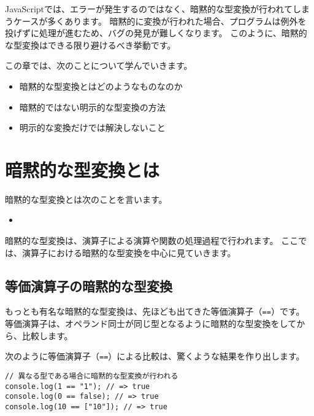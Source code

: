 JavaScriptでは、エラーが発生するのではなく、暗黙的な型変換が行われてしまうケースが多くあります。
暗黙的に変換が行われた場合、プログラムは例外を投げずに処理が進むため、バグの発見が難しくなります。
このように、暗黙的な型変換はできる限り避けるべき挙動です。

この章では、次のことについて学んでいきます。

\begin{itemize}
\item
  暗黙的な型変換とはどのようなものなのか
\item
  暗黙的ではない明示的な型変換の方法
\item
  明示的な変換だけでは解決しないこと
\end{itemize}

\hypertarget{what-is-implicit-coercion}{%
\section{暗黙的な型変換とは}\label{what-is-implicit-coercion}}

暗黙的な型変換とは次のことを言います。

\begin{itemize}
\item
\end{itemize}

暗黙的な型変換は、演算子による演算や関数の処理過程で行われます。
ここでは、演算子における暗黙的な型変換を中心に見ていきます。

\hypertarget{implicit-coercion-of-equal-operator}{%
\subsection{等価演算子の暗黙的な型変換}\label{implicit-coercion-of-equal-operator}}

もっとも有名な暗黙的な型変換は、先ほども出てきた等価演算子（\texttt{==}）です。
等価演算子は、オペランド同士が同じ型となるように暗黙的な型変換をしてから、比較します。

次のように等価演算子（\texttt{==}）による比較は、驚くような結果を作り出します。

\begin{lstlisting}
// 異なる型である場合に暗黙的な型変換が行われる
console.log(1 == "1"); // => true
console.log(0 == false); // => true
console.log(10 == ["10"]); // => true
\end{lstlisting}

